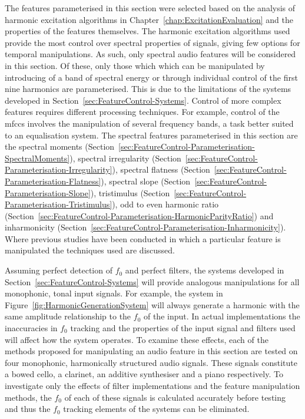 	The features parameterised in this section were selected based on the analysis of harmonic excitation algorithms in
	Chapter~\ref{chap:ExcitationEvaluation} and the properties of the features themselves. The harmonic excitation
	algorithms used provide the most control over spectral properties of signals, giving few options for temporal
	manipulations. As such, only spectral audio features will be considered in this section. Of these, only those which
	which can be manipulated by introducing of a band of spectral energy or through individual control of the first
	nine harmonics are parameterised. This is due to the limitations of the systems developed in
	Section~\ref{sec:FeatureControl-Systems}. Control of more complex features requires different processing
	techniques. For	example, control of the \acrshort{mfccs} involves the manipulation of several frequency bands, a
	task better suited to an equalisation system. The spectral features parameterised in this section are the spectral
	moments (Section~\ref{sec:FeatureControl-Parameterisation-SpectralMoments}), spectral irregularity
	(Section~\ref{sec:FeatureControl-Parameterisation-Irregularity}), spectral flatness
	(Section~\ref{sec:FeatureControl-Parameterisation-Flatness}), spectral slope
	(Section~\ref{sec:FeatureControl-Parameterisation-Slope}), tristimulus
	(Section~\ref{sec:FeatureControl-Parameterisation-Tristimulus}), odd to even harmonic ratio
	(Section~\ref{sec:FeatureControl-Parameterisation-HarmonicParityRatio}) and inharmonicity
	(Section~\ref{sec:FeatureControl-Parameterisation-Inharmonicity}). Where previous studies have been conducted in
	which a particular feature is manipulated the techniques used are discussed.

	Assuming perfect detection of $f_{0}$ and perfect filters, the systems developed in
	Section~\ref{sec:FeatureControl-Systems} will provide analogous manipulations for all monophonic, tonal input
	signals. For example, the system in Figure~\ref{fig:HarmonicGenerationSystem} will always generate a harmonic with
	the same amplitude relationship to the $f_{0}$ of the input. In actual implementations the inaccuracies in $f_{0}$
	tracking and the properties of the input signal and filters used will affect how the system operates. To examine
	these effects, each of the methods proposed for manipulating an audio feature in this section are tested on four
	monophonic, harmonically structured audio signals. These signals constitute a bowed cello, a clarinet, an additive
	synthesiser and a piano respectively. To investigate only the effects of filter implementations and the feature
	manipulation methods, the $f_{0}$ of each of these signals is calculated accurately before testing and thus the
	$f_{0}$ tracking elements of the systems can be eliminated.

